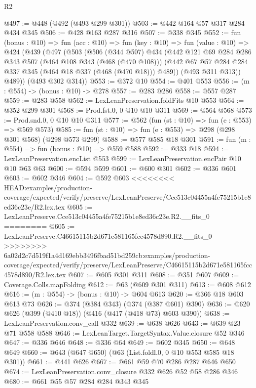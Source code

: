 \begin{lexlean}{R2}
\begin{coremodule}
{{{{{{{{{{{{{{{{{{{{{{@497 := @448 (@492 (@493 @299 @301))
@503 := @442 @164 @57 @317 @284 @434 @345
@506 := @428 @163 @287 @316
@507 := @338 @345
@552 := fun (bonus : @10) =>
  fun (acc : @10) =>
  fun (key : @10) =>
  fun (value : @10) =>
  @424
    (@439
      (@497
        (@503
          (@506
            (@344 @507)
            @434
            (@442
              @121
              @69
              @284
              @286
              @343
              @507
              (@464 @108 @343 (@468 (@470 @108)))
              (@442 @67 @57 @284 @284 @337 @345 (@464 @18 @337 (@468 (@470 @18))) @489))
            (@493 @311 @313))
          @489))
      (@493 @302 @314))
@553 := @372 @10
@554 := @401 @553
@556 := (m : @554) -> (bonus : @10) -> @278
@557 := @283 @286
@558 := @557 @287
@559 := @283 @558
@562 := LexLeanPreservation.foldFits @10 @553
@564 := @352 @299 @301
@568 := Prod.fst.{0, 0} @10 @10 @311
@569 := @564 @568
@573 := Prod.snd.{0, 0} @10 @10 @311
@577 := @562 (fun (st : @10) => fun (e : @553) => @569 @573)
@585 := fun (st : @10) => fun (e : @553) => @298 (@298 @301 @568) (@298 @573 @299)
@588 := @577 @585 @18 @301
@591 := fun (m : @554) => fun (bonus : @10) => @559 @588
@592 := @333 @18
@594 := LexLeanPreservation.encList @553
@599 := LexLeanPreservation.encPair @10 @10 @63 @63
@600 := @594 @599
@601 := @600 @301
@602 := @336 @601
@603 := @602 @346
@604 := @592 @603
<<<<<<<< HEAD:examples/production-coverage/expected/verify/preserve/LexLeanPreserve/Cce513c04455a4fe75215b1e8ed36c23e/R2.lex.tex
@605 := LexLeanPreserve.Cce513c04455a4fe75215b1e8ed36c23e.R2.__fits_0
========
@605 := LexLeanPreserve.C46615115b2d671e581165fcc4578d890.R2.__fits_0
>>>>>>>> 6a02d2c7d519f1a4d169ebb3496fbad51bd259cb:examples/production-coverage/expected/verify/preserve/LexLeanPreserve/C46615115b2d671e581165fcc4578d890/R2.lex.tex
@607 := @605 @301 @311
@608 := @351 @607
@609 := Coverage.Colls.mapFolding
@612 := @63 (@609 @301 @311)
@613 := @608 @612
@616 := (m : @554) -> (bonus : @10) -> @604 @613
@620 := @366 @18 @603 @613 @73
@626 := @374 (@384 @343) (@374 (@387 @601) @390)
@636 := @620 @626 (@399 (@410 @18)) (@416 (@417 (@418 @73) @603 @390))
@638 := LexLeanPreservation.conv_call @332
@639 := @638 @626
@643 := @639 @23 @71 @558 @588
@646 := LexLeanTarget.TargetSyntax.Value.closure @52 @346
@647 := @336 @646
@648 := @336 @64
@649 := @602 @345
@650 := @648 @649
@660 := @643 (@647 @650) (@63 (List.foldl.{0, 0} @10 @553 @585 @18 @301))
@661 := @441 @626
@667 := @661 @59 @70 @286 @287 @646 @650
@674 := LexLeanPreservation.conv_closure @332 @626 @52 @58 @286 @346
@680 := @661 @55 @57 @284 @284 @343 @345
}}}}}}}}}}}}}}}}}}}}}}
\end{coremodule}
\end{lexlean}
